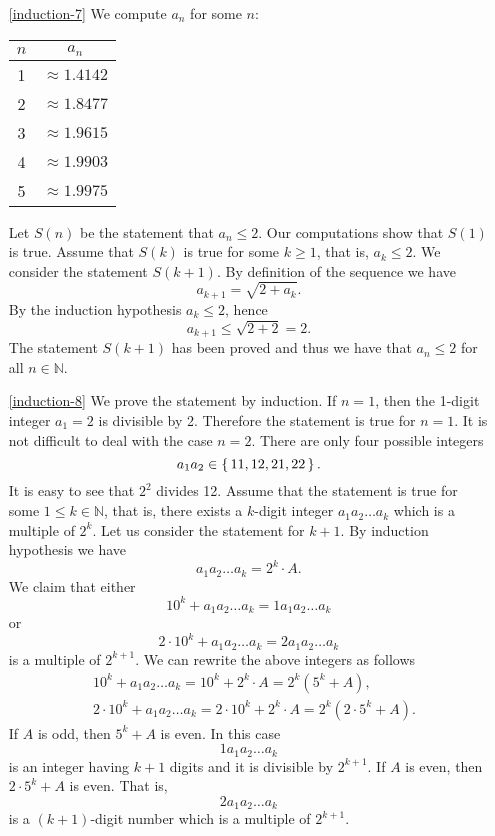\begin{enumerate}
\item[\ref{induction-7}] We compute $a_n$ for some $n:$
\begin{center}
\begin{tabular}{|c|c|}
\hline
$n$ & $a_n$\\
\hline
1 & $\approx 1.4142$\\
\hline
2 & $\approx 1.8477$\\
\hline
3 & $\approx 1.9615$\\
\hline
4 & $\approx 1.9903$\\
\hline
5 & $\approx 1.9975$\\
\hline
\end{tabular}
\end{center}
Let $S(n)$ be the statement that $a_n\leq 2$. Our computations show that $S(1)$ is true. Assume that $S(k)$ is true for some $k\geq 1$,
that is, $a_k\leq 2$. We consider the statement $S(k+1)$. By definition of the sequence we have 
$$
a_{k+1}=\sqrt{2+a_k}.
$$
By the induction hypothesis $a_k\leq 2$, hence
$$
a_{k+1}\leq \sqrt{2+2}=2.
$$
The statement $S(k+1)$ has been proved and thus we have that $a_n\leq 2$ for all $n\in\mathbb{N}$.

\item[\ref{induction-8}]
We prove the statement by induction. If $n=1$, then the 1-digit integer $a_1=2$ is divisible by 2. Therefore the statement is true
for $n=1$. It is not difficult to deal with the case $n=2$. There are only four possible integers
$$
a_1a_2\in\left\{\,11,12,21,22\,\right\}.
$$
It is easy to see that $2^2$ divides 12. Assume that the statement is true for some $1\leq k\in\mathbb{N}$, that is, there exists a
$k$-digit integer $a_1a_2\ldots a_k$ which is a multiple of $2^k$. Let us consider the statement for $k+1$. By induction hypothesis
we have
$$
a_1a_2\ldots a_k=2^k\cdot A.
$$
We claim that either
$$
10^{k}+a_1a_2\ldots a_k=1a_1a_2\ldots a_k
$$
or
$$
2\cdot 10^{k}+a_1a_2\ldots a_k=2a_1a_2\ldots a_k
$$
is a multiple of $2^{k+1}$. We can rewrite the above integers as follows
\begin{align*}
& 10^{k}+a_1a_2\ldots a_k=10^k+2^k\cdot A=2^k(5^k+A),\\
& 2\cdot 10^{k}+a_1a_2\ldots a_k=2\cdot 10^{k}+2^k\cdot A=2^k(2\cdot 5^k+A).
\end{align*}
If $A$ is odd, then $5^k+A$ is even. In this case 
$$
1a_1a_2\ldots a_k
$$
is an integer having $k+1$ digits and it is divisible by $2^{k+1}$.
If $A$ is even, then $2\cdot 5^k+A$ is even. That is, 
$$
2a_1a_2\ldots a_k
$$
is a $(k+1)$-digit number which is a multiple of $2^{k+1}$.


\end{enumerate}
